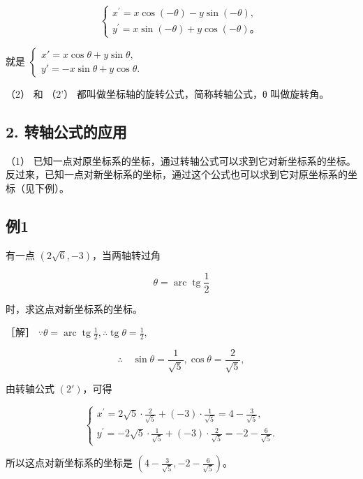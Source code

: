 \[
\left\{ \begin{array}{l} x^{\prime} = x \cos (- \theta) - y \sin (- \theta), \\ y^{\prime} = x \sin (- \theta) + y \cos (- \theta)\text{。} \end{array} \right.
\]

就是
\(\left\{ \begin{array}{l} x' = x \cos \theta + y \sin \theta, \\ y' = -x \sin \theta + y \cos \theta. \end{array} \right.\)

（2） 和 （2'） 都叫做坐标轴的旋转公式，简称转轴公式，θ 叫做旋转角。

\subsection{2.
转轴公式的应用}\label{ux8f6cux8f74ux516cux5f0fux7684ux5e94ux7528}

（1）
已知一点对原坐标系的坐标，通过转轴公式可以求到它对新坐标系的坐标。反过来，已知一点对新坐标系的坐标，通过这个公式也可以求到它对原坐标系的坐标（见下例）。

\subsection{例1}\label{ux4f8b1-35}

有一点 \((2\sqrt{6}, -3)\)，当两轴转过角

\[
\theta = \operatorname{arc} \operatorname{tg} \frac {1}{2}
\]

时，求这点对新坐标系的坐标。

［解］
\(\because \theta = \operatorname{arc} \operatorname{tg} \frac{1}{2}, \therefore \operatorname{tg} \theta = \frac{1}{2},\)

\[
\therefore \quad \sin \theta = \frac {1}{\sqrt {5}}, \cos \theta = \frac {2}{\sqrt {5}},
\]

由转轴公式 \((2')\)，可得

\[
\left\{ \begin{array}{l} x^{\prime} = 2 \sqrt {5} \cdot \frac {2}{\sqrt {5}} + (- 3) \cdot \frac {1}{\sqrt {5}} = 4 - \frac {3}{\sqrt {5}}, \\ y^{\prime} = - 2 \sqrt {5} \cdot \frac {1}{\sqrt {5}} + (- 3) \cdot \frac {2}{\sqrt {5}} = - 2 - \frac {6}{\sqrt {5}}. \end{array} \right.
\]

所以这点对新坐标系的坐标是
\(\left(4 - \frac{3}{\sqrt{5}}, -2 - \frac{6}{\sqrt{5}}\right)\)。

